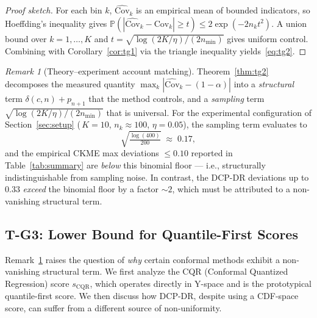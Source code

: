 \documentclass[11pt]{article}
\theoremstyle{remark}
\newtheorem{remark}[theorem]{Remark}
\begin{document}
\begin{proof}[Proof sketch]
For each bin $k$, $\widehat{\mathrm{Cov}}_k$ is an empirical mean of
bounded indicators, so Hoeffding's inequality gives
$\mathbb P(|\widehat{\mathrm{Cov}}_k - \mathrm{Cov}_k| \ge t) \le
2\exp(-2 n_k t^2)$. A union bound over $k = 1,\ldots,K$ and
$t = \sqrt{\log(2K/\eta)/(2 n_{\min})}$ gives uniform control.
Combining with Corollary~\ref{cor:tg1} via the triangle inequality
yields~\eqref{eq:tg2}.
\end{proof}

\begin{remark}[Theory--experiment account matching]
\label{rem:account-match}
Theorem~\ref{thm:tg2} decomposes the measured quantity
$\max_k |\widehat{\mathrm{Cov}}_k - (1-\alpha)|$ into a
\emph{structural} term $\delta(c,n) + p_{n+1}$ that the method
controls, and a \emph{sampling} term
$\sqrt{\log(2K/\eta) / (2 n_{\min})}$ that is universal. For the
experimental configuration of Section~\ref{sec:setup}
(\,$K = 10$, $n_k \approx 100$, $\eta = 0.05$), the sampling term
evaluates to
\[
  \sqrt{\tfrac{\log(400)}{200}} \;\approx\; 0.17,
\]
and the empirical CKME max deviations $\le 0.10$ reported in
Table~\ref{tab:summary} are \emph{below} this binomial floor --- i.e.,
structurally indistinguishable from sampling noise. In contrast, the
DCP-DR deviations up to $0.33$ \emph{exceed} the binomial floor by a
factor $\sim 2$, which must be attributed to a non-vanishing
structural term.
\end{remark}

\subsection{T-G3: Lower Bound for Quantile-First Scores}
\label{sec:tg3}

Remark~\ref{rem:account-match} raises the question of \emph{why}
certain conformal methods exhibit a non-vanishing structural term.
We first analyze the CQR (Conformal Quantized Regression) score
$s_{\mathrm{CQR}}$, which operates directly in Y-space and is the
prototypical quantile-first score. We then discuss how DCP-DR,
despite using a CDF-space score, can suffer from a different source of
non-uniformity.
\end{document}
